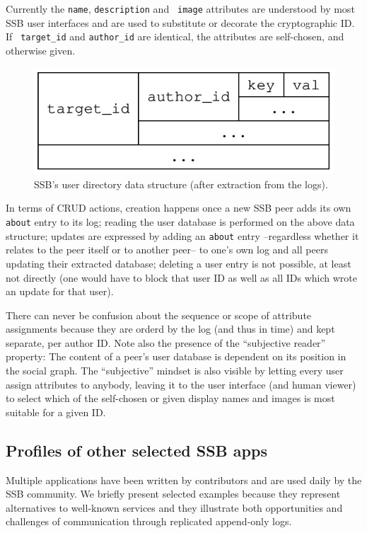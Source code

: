 \documentclass[10pt,sigconf]{acmart}
\begin{document}
Currently the {\small\tt name}, {\small\tt description} and {\small\tt
  image} attributes are understood by most SSB user interfaces and are
used to substitute or decorate the cryptographic ID. If {\small\tt
  target\_id} and {\small\tt author\_id} are identical, the
attributes are self-chosen, and otherwise given.

\begin{figure}[htb]
  \includegraphics[width=0.6\columnwidth]{figs/about-ds.pdf}
  \caption{SSB's user directory data structure (after extraction from the logs).}
  \label{fig:about}
\end{figure}

\noindent
In terms of CRUD actions, creation happens once a new SSB peer adds
its own {\small\tt about} entry to its log; reading the user database
is performed on the above data structure; updates are expressed by
adding an {\small\tt about} entry --regardless whether it relates to
the peer itself or to another peer-- to one's own log and all peers
updating their extracted database; deleting a user entry is not
possible, at least not directly (one would have to block that user ID
as well as all IDs which wrote an update for that user).

There can never be confusion about the sequence or scope of attribute
assignments because they are orderd by the log (and thus in time) and
kept separate, per author ID. Note also the presence of the
``subjective reader'' property: The content of a peer's user database
is dependent on its position in the social graph. The ``subjective''
mindset is also visible by letting every user assign attributes to
anybody, leaving it to the user interface (and human viewer) to select
which of the self-chosen or given display names and images is most suitable
for a given ID.

\subsection{Profiles of other selected SSB apps}
\label{Section:AppProfiles}

Multiple applications have been written by contributors and are used daily by
the SSB community. We briefly present selected examples because they represent
alternatives to well-known services and they illustrate both opportunities and
challenges of communication through replicated append-only logs.
\end{document}
